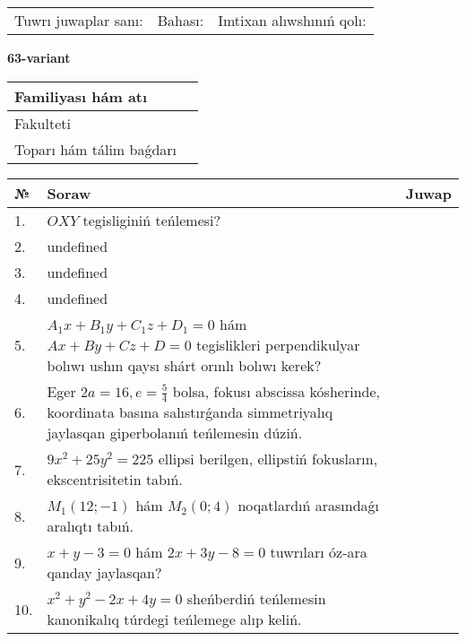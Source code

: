 \documentclass{article}
\begin{document}
\vspace{0.7cm}

\begin{tabular}{lll}
Tuwrı juwaplar sanı: \underline{\hspace{1cm}} & 
Bahası: \underline{\hspace{1cm}} & 
Imtixan alıwshınıń qolı: \underline{\hspace{2cm}} \\
\end{tabular}

\egroup

\newpage


\textbf{63-variant}\\

\bgroup
\def\arraystretch{1.6} %

\begin{tabular}{|m{5.7cm}|m{9.5cm}|}
\hline
Familiyası hám atı & \\
\hline
Fakulteti  & \\
\hline
Toparı hám tálim baǵdarı  & \\
\hline
\end{tabular}

\vspace{0.7cm}

\begin{tabular}{|m{0.7cm}|m{10cm}|m{4cm}|}
\hline
№ & Soraw & Juwap \\
\hline
1. & \(OXY\) tegisliginiń teńlemesi? &  \\
\hline
2. & undefined &  \\
\hline
3. & undefined &  \\
\hline
4. & undefined &  \\
\hline
5. & \(A_{1}x + B_{1}y + C_{1}z + D_{1} = 0\) hám \(Ax + By + Cz + D = 0\) tegislikleri perpendikulyar bolıwı ushın qaysı shárt orınlı bolıwı kerek? &  \\
\hline
6. & Eger \(2 a = 16, e = \frac{5}{4}\) bolsa, fokusı abscissa kósherinde, koordinata basına salıstırǵanda simmetriyalıq jaylasqan giperbolanıń teńlemesin dúziń. &  \\
\hline
7. & \(9 x^{2} + 25 y^{2} = 225\) ellipsi berilgen, ellipstiń fokusların, ekscentrisitetin tabıń. &  \\
\hline
8. & \(M_{1} (12; - 1)\) hám \(M_{2} (0;4)\) noqatlardıń arasındaǵı aralıqtı tabıń. &  \\
\hline
9. & \(x + y - 3 = 0\) hám \(2 x + 3 y - 8 = 0\) tuwrıları óz-ara qanday jaylasqan? &  \\
\hline
10. & \(x^{2} + y^{2} - 2 x + 4 y = 0\) sheńberdiń teńlemesin kanonikalıq túrdegi teńlemege alıp keliń. & \\
\hline
\end{tabular}
\end{document}
